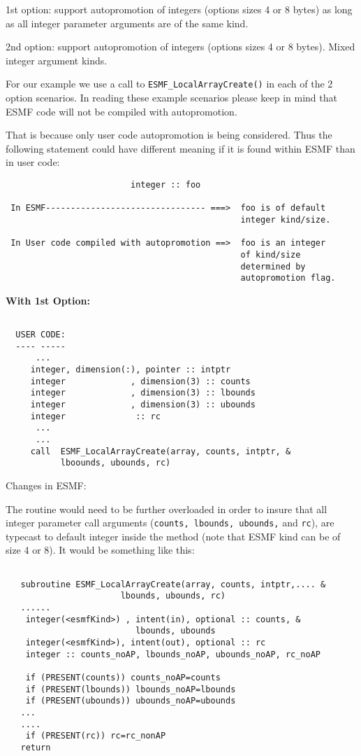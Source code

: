 1st option: support autopromotion of integers (options sizes 4 or 8 bytes) as long as all integer parameter arguments are of the same kind.

2nd option: support autopromotion of integers (options sizes 4 or 8 bytes). Mixed integer argument kinds.

For our example we use a call to {\tt ESMF\_LocalArrayCreate()} in each of the 2 option scenarios. In reading these example scenarios please keep in mind that ESMF code will not be compiled with autopromotion.

That is because only user code autopromotion is being considered. Thus the following statement could have different meaning if it is found within ESMF than in user code:
\begin{verbatim}
                         integer :: foo

 In ESMF-------------------------------- ===>  foo is of default 
                                               integer kind/size.

 In User code compiled with autopromotion ==>  foo is an integer
                                               of kind/size 
                                               determined by
                                               autopromotion flag.
\end{verbatim}

{\bf With 1st Option:}

\begin{verbatim}

  USER CODE:
  ---- -----
      ...
     integer, dimension(:), pointer :: intptr
     integer             , dimension(3) :: counts
     integer             , dimension(3) :: lbounds
     integer             , dimension(3) :: ubounds
     integer              :: rc
      ...
      ...
     call  ESMF_LocalArrayCreate(array, counts, intptr, &
           lboounds, ubounds, rc)
\end{verbatim}

Changes in ESMF:

The routine would need to be further overloaded in order to insure that all integer parameter call arguments ({\tt counts, lbounds, ubounds,} and {\tt rc}), are typecast to default integer inside the method (note that ESMF kind can be of size 4 or 8). It would be something like this:
\begin{verbatim}
  
   subroutine ESMF_LocalArrayCreate(array, counts, intptr,.... &
                       lbounds, ubounds, rc)
   ......
    integer(<esmfKind>) , intent(in), optional :: counts, &
                          lbounds, ubounds
    integer(<esmfKind>), intent(out), optional :: rc 
    integer :: counts_noAP, lbounds_noAP, ubounds_noAP, rc_noAP
  
    if (PRESENT(counts)) counts_noAP=counts
    if (PRESENT(lbounds)) lbounds_noAP=lbounds
    if (PRESENT(ubounds)) ubounds_noAP=ubounds
   ...
   ....
    if (PRESENT(rc)) rc=rc_nonAP
   return
\end{verbatim}

